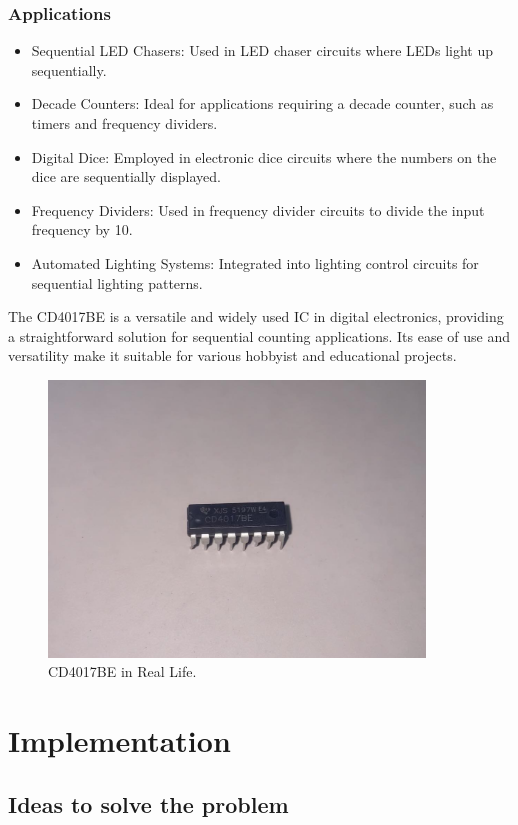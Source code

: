\documentclass{article}
\begin{document}
\subsubsection{Applications}
\begin{itemize}
    \item Sequential LED Chasers: Used in LED chaser circuits where LEDs light up sequentially.
    \item Decade Counters: Ideal for applications requiring a decade counter, such as timers and frequency dividers.
    \item Digital Dice: Employed in electronic dice circuits where the numbers on the dice are sequentially displayed.
    \item Frequency Dividers: Used in frequency divider circuits to divide the input frequency by 10.
    \item Automated Lighting Systems: Integrated into lighting control circuits for sequential lighting patterns.
\end{itemize}

The CD4017BE is a versatile and widely used IC in digital electronics, providing a straightforward solution for sequential counting applications. Its ease of use and versatility make it suitable for various hobbyist and educational projects.

\begin{figure}[h]
    \centering
    \includegraphics[width=10cm]{Pic/Pictures/4017 real.jpg}
    \caption{CD4017BE in Real Life.}
    \label{fig:enter-label}
\end{figure}
\newpage


\section{Implementation}
\subsection{Ideas to solve the problem}
\end{document}
